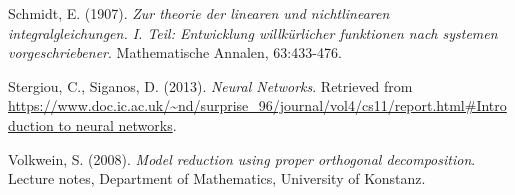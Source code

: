 \documentclass[longtitle]{elsarticle}
\numberwithin{equation}{section}
\theoremstyle{theorem}
\theoremstyle{definition}
\theoremstyle{remark}
\theoremstyle{proposition}
\numberwithin{figure}{section}
\begin{document}
\begin{thebibliography}{50}
		Schmidt, E. (1907). \emph{Zur theorie der linearen und nichtlinearen integralgleichungen. I. Teil: Entwicklung willk\"urlicher funktionen nach systemen vorgeschriebener}. Mathematische Annalen, 63:433-476.
		
		Stergiou, C., Siganos, D. (2013). \emph{Neural Networks}. Retrieved from \url{https://www.doc.ic.ac.uk/~nd/surprise_96/journal/vol4/cs11/report.html#Introduction to neural networks}.
		
		Volkwein, S. (2008). \emph{Model reduction using proper orthogonal decomposition}. Lecture notes, Department of Mathematics, University of Konstanz.
	\end{thebibliography}
	
\end{document}
